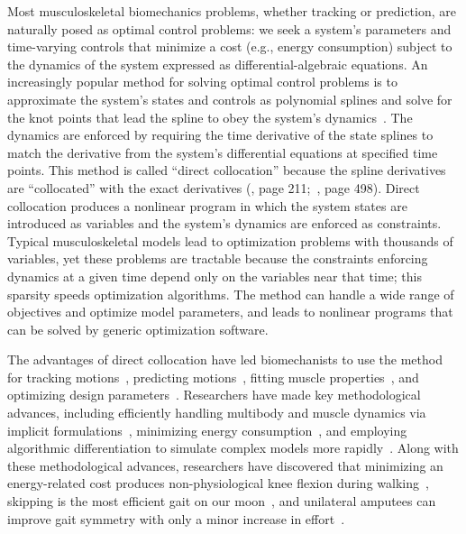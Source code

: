 \documentclass[10pt,letterpaper]{article}
\begin{document}
Most musculoskeletal biomechanics problems, whether tracking or prediction, are naturally posed as optimal control problems: we seek a system’s parameters and time-varying controls that minimize a cost (e.g., energy consumption) subject to the dynamics of the system expressed as differential-algebraic equations. An increasingly popular method for solving optimal control problems is to approximate the system’s states and controls as polynomial splines and solve for the knot points that lead the spline to obey the system’s dynamics~\cite{Betts:2010,Umberger:2018ec,Mombaur:2016eb,Kelly:2017}. The dynamics are enforced by requiring the time derivative of the state splines to match the derivative from the system’s differential equations at specified time points. This method is called “direct collocation” because the spline derivatives are “collocated” with the exact derivatives (\cite{Hairer:1993}, page 211;~\cite{Hairer:1996}, page 498). Direct collocation produces a nonlinear program in which the system states are introduced as variables and the system’s dynamics are enforced as constraints. Typical musculoskeletal models lead to optimization problems with thousands of variables, yet these problems are tractable because the constraints enforcing dynamics at a given time depend only on the variables near that time; this sparsity speeds optimization algorithms. The method can handle a wide range of objectives and optimize model parameters, and leads to nonlinear programs that can be solved by generic optimization software.

The advantages of direct collocation have led biomechanists to use the method for tracking motions~\cite{Lin:2017jp,Mehrabi:2019}, predicting motions~\cite{Ackermann:2010dd,Miller:2015fc,Porsa:2015dn,Meyer:2016gl,Lee:2016dn,KMoore:2018ea,Lin:2018ex,Lai:2018,Nguyen:2019,Falisse:2019b}, fitting muscle properties~\cite{Falisse:2016}, and optimizing design parameters~\cite{Rohani:2017}. Researchers have made key methodological advances, including efficiently handling multibody and muscle dynamics via implicit formulations~\cite{vandenBogert:2011fv,Groote:2016dq}, minimizing energy consumption~\cite{Koelewijn:2018kw,Koelewijn:2019}, and employing algorithmic differentiation to simulate complex models more rapidly~\cite{Falisse:2019a}. Along with these methodological advances, researchers have discovered that minimizing an energy-related cost produces non-physiological knee flexion during walking~\cite{Ackermann:2010dd}, skipping is the most efficient gait on our moon~\cite{Ackermann:2012}, and unilateral amputees can improve gait symmetry with only a minor increase in effort~\cite{Koelewijn:2016bm}.
\end{document}

